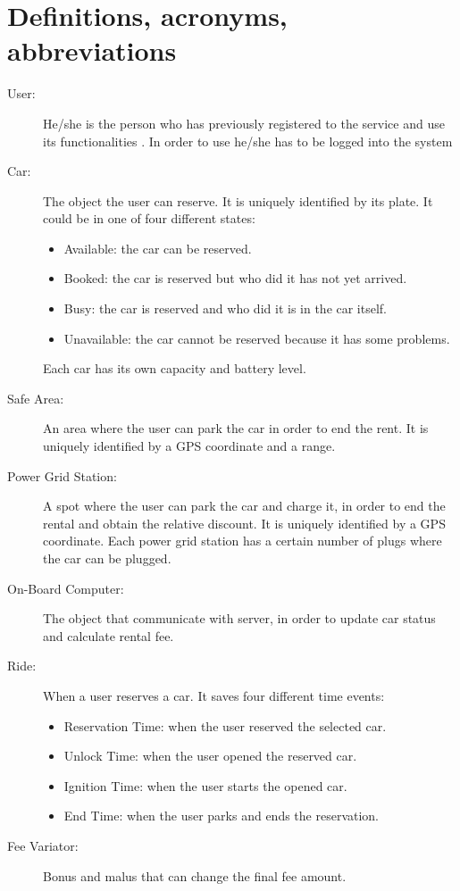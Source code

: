\section{Definitions, acronyms, abbreviations}
\begin{description}
	\item [User:] He/she is the person who has previously registered to the service and use its functionalities . In order to use he/she has to be logged into the system
	\item [Car:] The object the user can reserve. It is uniquely identified by its plate. It could be in one of four different states:
	\begin{itemize}
		\item Available: the car can be reserved.
		\item Booked: the car is reserved but who did it has not yet arrived.
		\item Busy: the car is reserved and who did it is in the car itself.
		\item Unavailable: the car cannot be reserved because it has some problems.
	\end{itemize}
	Each car has its own capacity and battery level.
	\item [Safe Area:] An area where the user can park the car in order to end the rent. It is uniquely identified by a GPS coordinate and a range.
	\item [Power Grid Station:] A spot where the user can park the car and charge it, in order to end the rental and obtain the relative discount. It is uniquely identified by a GPS coordinate. Each power grid station has a certain number of plugs where the car can be plugged.
	\item [On-Board Computer:] The object that communicate with server, in order to update car status and calculate rental fee.
	\item [Ride:] When a user reserves a car. It saves four different time events:
	\begin{itemize}
		\item Reservation Time: when the user reserved the selected car.
		\item Unlock Time: when the user opened the reserved car.
		\item Ignition Time: when the user starts the opened car.
		\item End Time: when the user parks and ends the reservation.
	\end{itemize}
	\item [Fee Variator:] Bonus and malus that can change the final fee amount.
	

\end{description}
